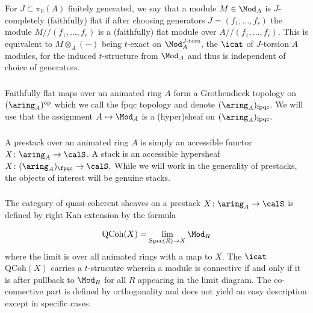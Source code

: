 \documentclass[10pt,reqno]{amsart}
\numberwithin{equation}{section}
\newcommand{\spec}{{\mathrm{Spec}}}
\newcommand{\Qcoh}{\mathrm{QCoh}}
\begin{document}
\subsubsection{}\label{jcompflat}For $J\subset \pi_0(A)$ finitely generated, we say that a module $M\in \Mod_A$ is $J$-completely (faithfully) flat if after choosing generators $J=(f_1,\ldots, f_r)$ the module $M/\!\!/(f_1,\ldots, f_r)$ is a (faithfully) flat module over $A/\!\!/(f_1,\ldots, f_r)$. This is equivalent to $M\otimes_A(-)$ being $t$-exact on $\Mod_A^{J\text{-}\mathrm{tors}}$, the $\icat$ of $J$-torsion $A$ modules, for the induced $t$-structure from $\Mod_A$ and thus is independent of choice of generators.


\subsubsection{}
Faithfully flat maps over an animated ring $A$ form a Grothendieck topology on $(\aring_A)^\mathrm{op}$ which we call the fpqc topology and denote $(\aring_{A})_{\mathrm{fpqc}}.$ We will use that the assignment $A\mapsto \Mod_A$ is a (hyper)sheaf on $(\aring_{A})_{\mathrm{fpqc}}.$


\subsubsection{}
A prestack over an animated ring $A$ is simply an accessible functor $X\colon \aring_A\to \calS$. A stack is an accessible hypersheaf  $X\colon (\aring_A)_{\fpqc}\to \calS.$ While we will work in the generality of prestacks, the objects of interest will be genuine stacks.


\subsubsection{}\label{right kan qcoh.}
The category of quasi-coherent sheaves on a prestack $X\colon \aring_A\to \calS$ is defined by right Kan extension by the formula 

$$\Qcoh(X)=\lim_{\spec(R)\to X} \Mod_R$$ where the limit is over all animated rings with a map to $X.$ The $\icat$ $\Qcoh(X)$ carries a $t$-strucutre wherein a module is connective if and only if it is after pullback to $\Mod_R$ for all $R$ appearing in the limit diagram. The co-connective part is defined by orthogonality and does not yield an easy description except in specific cases. 
\end{document}
